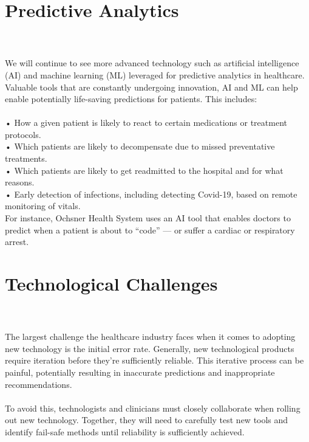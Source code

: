 \documentclass[12pt]{article}
\begin{document}
\section{Predictive Analytics}
\\
\\
We will continue to see more advanced technology such as artificial intelligence (AI) and machine learning (ML) leveraged for predictive analytics in healthcare. Valuable tools that are constantly undergoing innovation, AI and ML can help enable potentially life-saving predictions for patients. This includes:
\\
\\
• How a given patient is likely to react to certain medications or treatment protocols.
\\
• Which patients are likely to decompensate due to missed preventative treatments.
\\
• Which patients are likely to get readmitted to the hospital and for what reasons.
\\
• Early detection of infections, including detecting Covid-19, based on remote monitoring of vitals.
\\
For instance, Ochsner Health System uses an AI tool that enables doctors to predict when a patient is about to “code” — or suffer a cardiac or respiratory arrest.
\section{Technological Challenges}
\\
\\
The largest challenge the healthcare industry faces when it comes to adopting new technology is the initial error rate. Generally, new technological products require iteration before they’re sufficiently reliable. This iterative process can be painful, potentially resulting in inaccurate predictions and inappropriate recommendations.
\\
\\
To avoid this, technologists and clinicians must closely collaborate when rolling out new technology. Together, they will need to carefully test new tools and identify fail-safe methods until reliability is sufficiently achieved.
\end{document}
